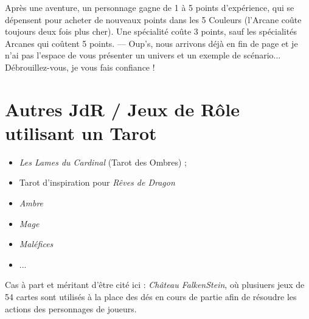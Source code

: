 \documentclass[11pt,twoside,a4paper]{article}
\begin{document}
Apr{\`e}s une aventure, un personnage gagne de 1 {\`a} 5 points d'exp{\'e}rience, qui se d{\'e}pensent pour acheter de nouveaux points dans les 5 Couleurs (l'Arcane co{\^u}te toujours deux fois plus cher). Une sp{\'e}cialit{\'e} co{\^u}te 3 points, sauf les sp{\'e}cialit{\'e}s Arcanes qui co{\^u}tent 5 points. 
--- Oup's, nous arrivons d{\'e}j{\`a} en fin de page et je n'ai pas l'espace de vous pr{\'e}senter un univers et un exemple de sc{\'e}nario... D{\'e}brouillez-vous, je vous fais confiance !

\clearpage


\section{Autres JdR / Jeux de R{\^o}le utilisant un Tarot}

\begin{itemize}
	\item \emph{Les Lames du Cardinal} (Tarot des Ombres) ; 
	\item Tarot d'inspiration pour \emph{R{\^e}ves de Dragon}
	\item \emph{Ambre}
	\item \emph{Mage}
	\item \emph{Mal{\'e}fices}
	\item ...
\end{itemize}

Cas {\`a} part et m{\'e}ritant d'{\^e}tre cit{\'e} ici : \emph{Ch{\^a}teau FalkenStein}, o{\`u} plusiuers jeux de 54 cartes sont utilis{\'e}s {\`a} la place des d{\'e}s en cours de partie afin de r{\'e}soudre les actions des personnages de joueurs. 



\clearpage
\end{document}
